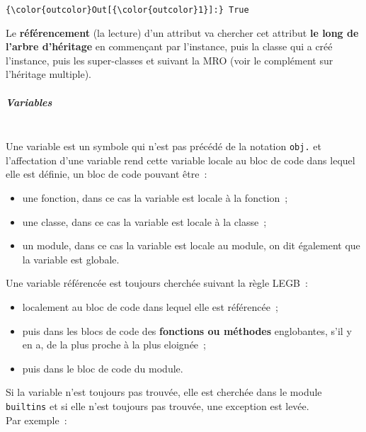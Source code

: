 \begin{Verbatim}[commandchars=\\\{\}]
{\color{outcolor}Out[{\color{outcolor}1}]:} True
\end{Verbatim}
            
    Le \textbf{référencement} (la lecture) d'un attribut va chercher cet
attribut \textbf{le long de l'arbre d'héritage} en commençant par
l'instance, puis la classe qui a créé l'instance, puis les super-classes
et suivant la MRO (voir le complément sur l'héritage multiple).

    \hypertarget{variables}{%
\subparagraph{Variables\\\\}\label{variables}}

    Une variable est un symbole qui n'est pas précédé de la notation
\texttt{obj.} et l'affectation d'une variable rend cette variable locale
au bloc de code dans lequel elle est définie, un bloc de code pouvant
être~:

\begin{itemize}
\tightlist
\item
  une fonction, dans ce cas la variable est locale à la fonction~;
\item
  une classe, dans ce cas la variable est locale à la classe~;
\item
  un module, dans ce cas la variable est locale au module, on dit
  également que la variable est globale.
\end{itemize}

Une variable référencée est toujours cherchée suivant la règle LEGB~:

\begin{itemize}
\tightlist
\item
  localement au bloc de code dans lequel elle est référencée~;
\item
  puis dans les blocs de code des \textbf{fonctions ou méthodes}
  englobantes, s'il y en a, de la plus proche à la plus eloignée~;
\item
  puis dans le bloc de code du module.
\end{itemize}

Si la variable n'est toujours pas trouvée, elle est cherchée dans le
module \texttt{builtins} et si elle n'est toujours pas trouvée, une
exception est levée.\\

Par exemple~:

